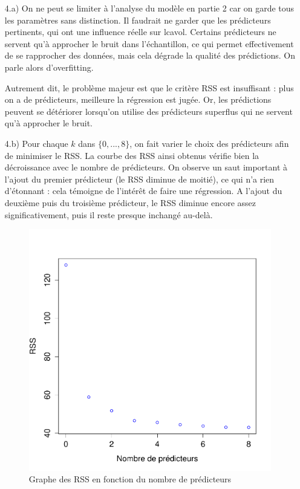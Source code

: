\documentclass[a4paper, 12pt]{article}
\begin{document}
\begin{enumerate}
\setlength{\itemsep}{12pt}

\item[4.a)] On ne peut se limiter à l'analyse du modèle en partie 2 car on garde tous les paramètres sans distinction. Il faudrait ne garder que les prédicteurs pertinents, qui ont une influence réelle sur lcavol. Certains prédicteurs ne servent qu'à approcher le bruit dans l'échantillon, ce qui permet effectivement de se rapprocher des données, mais cela dégrade la qualité des prédictions. On parle alors d'overfitting.

Autrement dit, le problème majeur est que le critère RSS est insuffisant : plus on a de prédicteurs, meilleure la régression est jugée. Or, les prédictions peuvent se détériorer lorsqu'on utilise des prédicteurs superflus qui ne servent qu'à approcher le bruit.

\item[4.b)] Pour chaque $k$ dans $\{0, ..., 8\}$, on fait varier le choix des prédicteurs afin de minimiser le RSS. La courbe des RSS ainsi obtenus vérifie bien la décroissance avec le nombre de prédicteurs. On observe un saut important à l'ajout du premier prédicteur (le RSS diminue de moitié), ce qui n'a rien d'étonnant : cela témoigne de l'intérêt de faire une régression. A l'ajout du deuxième puis du troisième prédicteur, le RSS diminue encore assez significativement, puis il reste presque inchangé au-delà.

\begin{figure}
\begin{center}
\includegraphics[scale=1]{rss.pdf}
\caption{Graphe des RSS en fonction du nombre de prédicteurs}
\end{center}
\end{figure}


\end{enumerate}
\end{document}
